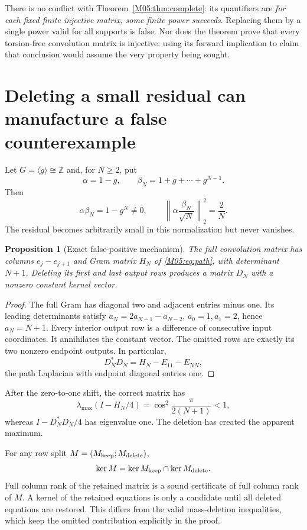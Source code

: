 \documentclass[11pt,a4paper,oneside]{report}
\newtheorem{proposition}[theorem]{Proposition}
\theoremstyle{definition}
\theoremstyle{remark}
\newcommand{\Z}{\mathbb Z}
\begin{document}
There is no conflict with Theorem~\ref{M05:thm:complete}: its
quantifiers are \emph{for each fixed finite injective matrix,
some finite power succeeds}. Replacing them by a single power
valid for all supports is false. Nor does the theorem prove that
every torsion-free convolution matrix is injective: using its
forward implication to claim that conclusion would assume the
very property being sought.

\section{Deleting a small residual can manufacture a false counterexample}
\label{M05:sec:boundary}

Let $G=\langle g\rangle\cong\Z$ and, for $N\ge2$, put
\[
 \alpha=1-g,\qquad \beta_N=1+g+\cdots+g^{N-1}.
\]
Then
\begin{equation}\label{M05:eq:boundary}
 \alpha\beta_N=1-g^N\ne0,\qquad
 \left\|\alpha\frac{\beta_N}{\sqrt N}\right\|_2^2=\frac2N .
\end{equation}
The residual becomes arbitrarily small in this normalization but
never vanishes.

\begin{proposition}[Exact false-positive mechanism]\label{M05:prop:false}
The full convolution matrix has columns $e_j-e_{j+1}$ and Gram
matrix $H_N$ of \eqref{M05:eq:path}, with determinant $N+1$.
Deleting its first and last \emph{output rows} produces a matrix
$D_N$ with a nonzero constant kernel vector.
\end{proposition}
\begin{proof}
The full Gram has diagonal two and adjacent entries minus one.
Its leading determinants satisfy
$a_N=2a_{N-1}-a_{N-2}$, $a_0=1,a_1=2$, hence $a_N=N+1$.
Every interior output row is a difference of consecutive input
coordinates. It annihilates the constant vector. The omitted
rows are exactly its two nonzero endpoint outputs. In particular,
\[
 D_N^*D_N=H_N-E_{11}-E_{NN},
\]
the path Laplacian with endpoint diagonal entries one.
\end{proof}

After the zero-to-one shift, the correct matrix has
\[
 \lambda_{\max}(I-H_N/4)
 =\cos^2\frac{\pi}{2(N+1)}<1,
\]
whereas $I-D_N^*D_N/4$ has eigenvalue one. The deletion has
created the apparent maximum.

For any row split $M=(M_{\rm keep};M_{\rm delete})$,
\begin{equation}\label{M05:eq:rowrule}
 \ker M=\ker M_{\rm keep}\cap\ker M_{\rm delete}.
\end{equation}
Full column rank of the retained matrix is a sound certificate of
full column rank of $M$. A kernel of the retained equations is only a
candidate until all deleted equations are restored.
This differs from the valid mass-deletion inequalities, which
keep the omitted contribution explicitly in the proof.
\end{document}
